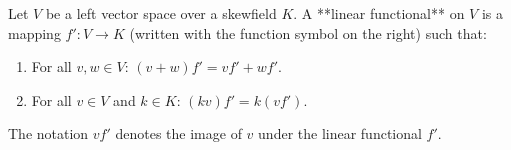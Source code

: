 Let $V$ be a left vector space over a skewfield $K$. A **linear functional** on $V$ is a mapping $f' \colon V \to K$ (written with the function symbol on the right) such that:
\begin{enumerate}
\item[(i)] For all $v, w \in V$: $(v + w)f' = vf' + wf'$.
\item[(ii)] For all $v \in V$ and $k \in K$: $(kv)f' = k(vf')$.
\end{enumerate}
The notation $vf'$ denotes the image of $v$ under the linear functional $f'$.
